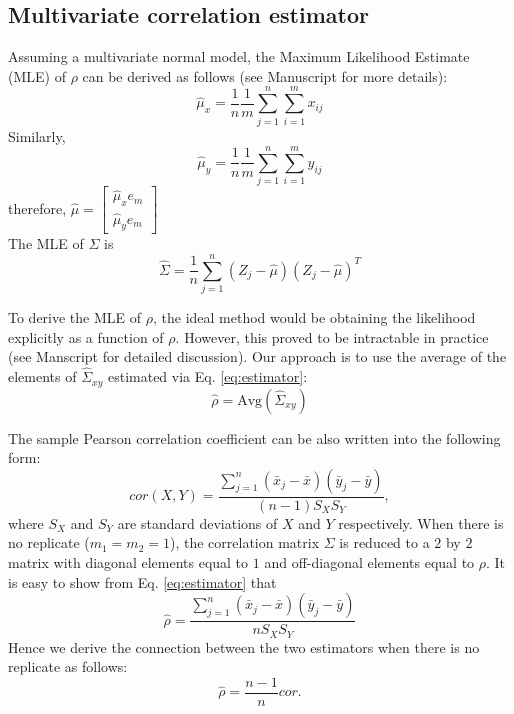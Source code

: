 \documentclass[a4paper]{article}
\begin{document}
\subsection{Multivariate correlation estimator}\label{sec:est}
Assuming a multivariate normal model, the Maximum Likelihood
Estimate (MLE) of $\rho$ can be derived as follows (see Manuscript for
more details):
\begin{equation} \label{eq:mux}
\hat{\mu}_{x}=
\frac{1}{n}\frac{1}{m}\sum_{j=1}^{n}\sum_{i=1}^{m}x_{ij}
\end{equation}
\noindent Similarly,\\
\begin{equation} \label{eq:muy}
\hat{\mu}_{y}=
\frac{1}{n}\frac{1}{m}\sum_{j=1}^{n}\sum_{i=1}^{m}y_{ij}
\end{equation}
\noindent therefore, $\hat{\mu}=\left[\begin{array}{ll}\hat{\mu}_{x}e_{m}\\
\hat{\mu}_{y}e_{m}\end{array}\right]$ \\
\noindent The MLE of $\Sigma$ is \\
\begin{equation} \label{eq:estimator}
\hat{\Sigma}=
\frac{1}{n}\sum_{j=1}^{n}(Z_{j}-\hat{\mu})(Z_{j}-\hat{\mu})^{T}
\end{equation}

To derive the MLE of $\rho$, the ideal method would be obtaining the
likelihood explicitly as a function of $\rho$. However, this proved
to be intractable in practice (see Manscript for detailed
discussion). Our approach is to use the average of the elements of
$\hat{\Sigma}_{xy}$ estimated via Eq. \ref{eq:estimator}:\\
\begin{equation} \label{eq:estimator.avg}
\hat\rho=\mathrm{Avg}(\hat{\Sigma}_{xy})
\end{equation}

The sample Pearson correlation coefficient 
can be also written into the following form:
\begin{equation}
cor(X,Y) =
\frac{\sum_{j=1}^{n}(\bar{x}_{j}-\bar{x})(\bar{y}_{j}-\bar{y})}{(n-1)S_XS_Y},
\end{equation}
where $S_X$ and $S_Y$ are standard deviations of $X$ and $Y$
respectively. When there is no replicate ($m_1=m_2=1$), the correlation
matrix $\Sigma$ is reduced to a $2$ by $2$ matrix with diagonal
elements equal to $1$ and off-diagonal elements equal to $\rho$. It
is easy to show from Eq. \ref{eq:estimator} that
\begin{equation}
\hat\rho =
\frac{\sum_{j=1}^{n}(\bar{x}_{j}-\bar{x})(\bar{y}_{j}-\bar{y})}{nS_XS_Y}
\end{equation}
Hence we derive the connection between the two estimators when there
is no replicate as follows:
\begin{equation}
\hat\rho = \frac{n-1}{n}cor.
\end{equation}
\end{document}
